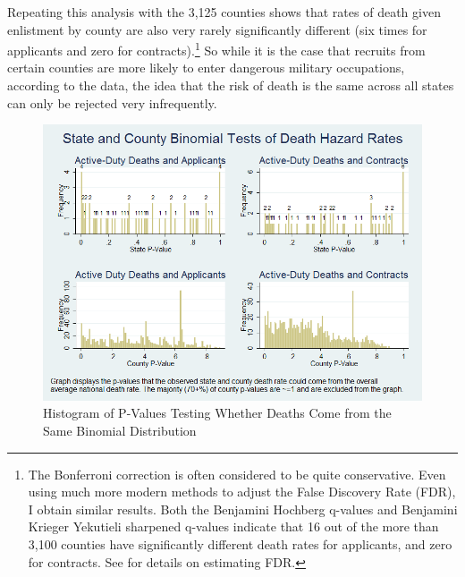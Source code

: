 \documentclass[12pt] {article}
\begin{document}
Repeating this analysis with the 3,125 counties shows that rates of death given enlistment by county are also very rarely significantly different (six times for applicants and zero for contracts).\footnote{The Bonferroni correction is often considered to be quite conservative. Even using much more modern methods to adjust the False Discovery Rate (FDR), I obtain similar results. Both the Benjamini Hochberg q-values and Benjamini Krieger Yekutieli sharpened q-values indicate that 16 out of the more than 3,100 counties have significantly different death rates for applicants, and zero for contracts. See \cite{BenHoch1995, BKY2006, Anderson2008} for details on estimating FDR.} So while it is the case that recruits from certain counties are more likely to enter dangerous military occupations, according to the data, the idea that the risk of death is the same across all states can only be rejected very infrequently. 

\begin{figure}
\includegraphics[scale=0.5]{../Output/hist_binomial_combined.png}
\caption{Histogram of P-Values Testing Whether Deaths Come from the
Same Binomial Distribution}
\label{Flo:Pat's Histo}
\end{figure}
\clearpage{}
\end{document}
